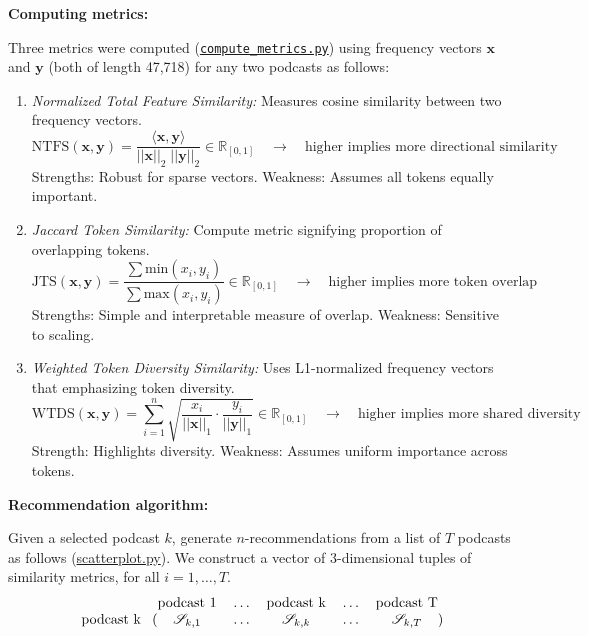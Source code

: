 \documentclass{article}
\begin{document}
\noindent \textbf{Computing metrics:} 

\noindent Three metrics were computed (\href{https://github.com/Stochastic1017/Spotify-Podcast-Clustering/blob/main/models/compute_metrics.py}{\texttt{compute\_metrics.py}}) using frequency vectors $\bm{x}$ and $\bm{y}$ (both of length 47,718) for any two podcasts as follows:

\begin{enumerate}
    \item \textit{Normalized Total Feature Similarity:} Measures cosine similarity between two frequency vectors.
    $$\text{NTFS}(\bm{x},\bm{y}) = \frac{\langle \bm{x}, \bm{y}\rangle}{||\bm{x}||_{2}\;||\bm{y}||_{2}} \in \mathbb{R}_{[0,1]} \quad \longrightarrow \quad \text{higher implies more directional similarity}$$
    Strengths: Robust for sparse vectors. Weakness: Assumes all tokens equally important.
    \item \textit{Jaccard Token Similarity:} Compute metric signifying proportion of overlapping tokens.
    $$\text{JTS}(\bm{x},\bm{y}) = \frac{\sum \text{min}(x_i, y_i)}{\sum \text{max}(x_i, y_i)} \in \mathbb{R}_{[0,1]} \quad \longrightarrow \quad \text{higher implies more token overlap}$$
    Strengths: Simple  and interpretable measure of overlap. Weakness: Sensitive to scaling.
    \item \textit{Weighted Token Diversity Similarity:} Uses L1-normalized frequency vectors that emphasizing token diversity.
    $$ \text{WTDS}(\bm{x},\bm{y}) = \sum_{i=1}^{n} \sqrt{ \frac{x_i}{||\bm{x}||_{1}} \cdot \frac{y_i}{||\bm{y}||_{1}} } \in \mathbb{R}_{[0,1]} \quad \longrightarrow \quad \text{higher implies more shared diversity}$$
    Strength: Highlights diversity. Weakness: Assumes uniform importance across tokens.
\end{enumerate}


\noindent \textbf{Recommendation algorithm:} 

\noindent Given a selected podcast $k$, generate $n$-recommendations from a list of $T$ podcasts as follows (\href{https://github.com/Stochastic1017/Spotify-Podcast-Clustering/blob/main/dash_app/helpers/scatterplot.py}{scatterplot.py}). We construct a vector of 3-dimensional tuples of similarity metrics, for all $i=1,\dots,T$.
\[
\begin{blockarray}{cccccc}
    & \text{podcast 1} & \dots & \text{podcast k} & \dots & \text{podcast T} \\
    \begin{block}{c(ccccc)}
    \text{podcast k} & \mathcal{S}_{k,1} & \dots & \mathcal{S}_{k,k} & \dots & \mathcal{S}_{k,T} \\
    \end{block}
\end{blockarray}
\]
\end{document}
